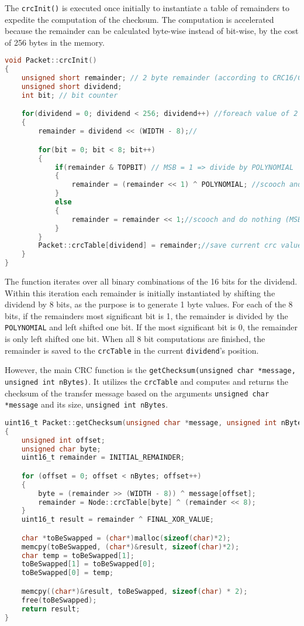 The \texttt{crcInit()} is executed once initially to instantiate a table of remainders to expedite the computation of the checksum. The computation is accelerated because the remainder can be calculated byte-wise instead of bit-wise, by the cost of 256 bytes in the memory.  

\begin{lstlisting}[language=C, caption={Initializes CTC table.}]
void Packet::crcInit()
{
    unsigned short remainder; // 2 byte remainder (according to CRC16/CCITT standard)
    unsigned short dividend; 
    int bit; // bit counter

    for(dividend = 0; dividend < 256; dividend++) //foreach value of 2 bytes/8 bits
    {
        remainder = dividend << (WIDTH - 8);//

        for(bit = 0; bit < 8; bit++)
        {
            if(remainder & TOPBIT) // MSB = 1 => divide by POLYNOMIAL
            {
                remainder = (remainder << 1) ^ POLYNOMIAL; //scooch and divide
            }
            else
            {
		        remainder = remainder << 1;//scooch and do nothing (MSB = 0, move along)
	        }
        }
    	Packet::crcTable[dividend] = remainder;//save current crc value in crcTable
    }
}
\end{lstlisting}

The function iterates over all binary combinations of the 16 bits for the dividend. Within this iteration each remainder is initially instantiated by shifting the dividend by 8 bits, as the purpose is to generate 1 byte values. For each of the 8 bits, if the remainders most significant bit is 1, the remainder is divided by the \texttt{POLYNOMIAL} and left shifted one bit. If the most significant bit is 0, the remainder is only left shifted one bit. When all 8 bit computations are finished, the remainder is saved to the \texttt{crcTable} in the current \texttt{dividend}'s position.

However, the main CRC function is the \texttt{getChecksum(unsigned char *message, unsigned int nBytes)}. It utilizes the \texttt{crcTable} and computes and returns the checksum of the transfer message based on the arguments \texttt{unsigned char *message} and its size, \texttt{unsigned int nBytes}.

\begin{lstlisting}[language=C, caption={Determines and returns the checksum.}]
uint16_t Packet::getChecksum(unsigned char *message, unsigned int nBytes)
{
    unsigned int offset;
    unsigned char byte;
    uint16_t remainder = INITIAL_REMAINDER;

    for (offset = 0; offset < nBytes; offset++)
    {
        byte = (remainder >> (WIDTH - 8)) ^ message[offset];
        remainder = Node::crcTable[byte] ^ (remainder << 8);
    }
    uint16_t result = remainder ^ FINAL_XOR_VALUE;

    char *toBeSwapped = (char*)malloc(sizeof(char)*2);
    memcpy(toBeSwapped, (char*)&result, sizeof(char)*2);
    char temp = toBeSwapped[1];
    toBeSwapped[1] = toBeSwapped[0];
    toBeSwapped[0] = temp;

    memcpy((char*)&result, toBeSwapped, sizeof(char) * 2);
    free(toBeSwapped);
    return result;
}
\end{lstlisting}

